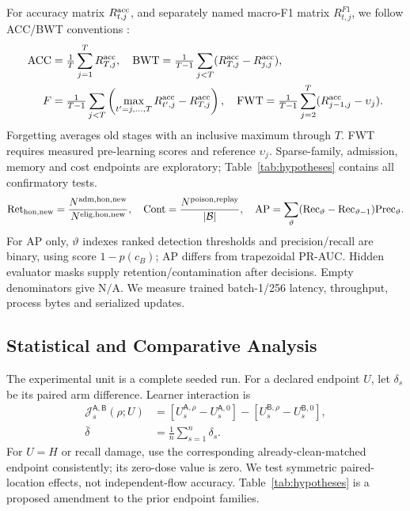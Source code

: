 \documentclass[10pt,a4paper]{article}
\newcommand{\NA}{\mathrm{N/A}}
\begin{document}
For accuracy matrix $R^{\rm acc}_{t,j}$, and separately named macro-F1 matrix $R^{F1}_{t,j}$, we follow ACC/BWT conventions \cite{gem,clmetrics}:
\begin{equation}
\begin{aligned}
\mathrm{ACC}&=\tfrac1T\sum_{j=1}^TR^{\rm acc}_{T,j},\quad
\mathrm{BWT}=\tfrac1{T-1}\sum_{j<T}(R^{\rm acc}_{T,j}-R^{\rm acc}_{j,j}),\\
F&=\tfrac1{T-1}\sum_{j<T}\left(\max_{t'=j,\ldots,T}R^{\rm acc}_{t',j}-R^{\rm acc}_{T,j}\right),\quad
\mathrm{FWT}=\tfrac1{T-1}\sum_{j=2}^T(R^{\rm acc}_{j-1,j}-\upsilon_j).
\end{aligned}
\label{eq:continual}
\end{equation}
Forgetting averages old stages with an inclusive maximum through $T$. FWT requires measured pre-learning scores and reference $\upsilon_j$. Sparse-family, admission, memory and cost endpoints are exploratory; Table~\ref{tab:hypotheses} contains all confirmatory tests.
\begin{equation}
\mathrm{Ret}_{\rm hon,new}=\frac{N^{\rm adm,hon,new}}{N^{\rm elig,hon,new}},\quad
\mathrm{Cont}=\frac{N^{\rm poison,replay}}{|\mathcal B|},\quad
\mathrm{AP}=\sum_\vartheta(\mathrm{Rec}_\vartheta-\mathrm{Rec}_{\vartheta-1})\mathrm{Prec}_\vartheta.
\label{eq:diagnostics}
\end{equation}
For AP only, $\vartheta$ indexes ranked detection thresholds and precision/recall are binary, using score $1-p(c_B)$; AP differs from trapezoidal PR-AUC. Hidden evaluator masks supply retention/contamination after decisions. Empty denominators give $\NA$. We measure trained batch-1/256 latency, throughput, process bytes and serialized updates.

\subsection{Statistical and Comparative Analysis}
The experimental unit is a complete seeded run. For a declared endpoint $U$, let $\delta_s$ be its paired arm difference. Learner interaction is
\begin{equation}
\begin{aligned}
\mathcal J_s^{\mathsf A,\mathsf B}(\rho;U)&=[U_s^{\mathsf A,\rho}-U_s^{\mathsf A,0}]-[U_s^{\mathsf B,\rho}-U_s^{\mathsf B,0}],\\
\bar\delta&=\tfrac1n\sum_{s=1}^n\delta_s.
\end{aligned}
\label{eq:interaction}
\end{equation}
For $U=H$ or recall damage, use the corresponding already-clean-matched endpoint consistently; its zero-dose value is zero. We test symmetric paired-location effects, not independent-flow accuracy. Table~\ref{tab:hypotheses} is a proposed amendment to the prior endpoint families.
\end{document}
